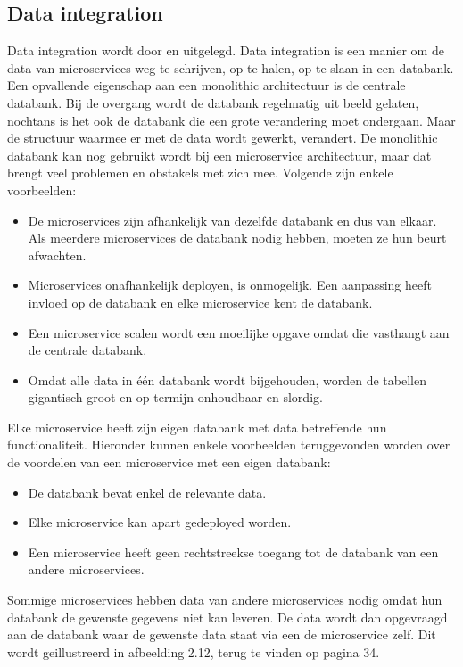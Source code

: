 \subsection{Data integration}
Data integration wordt door \textcite{Aradhye2018} en \textcite{Kumar2018} uitgelegd. Data integration is een manier om de data van microservices weg te schrijven, op te halen, op te slaan in een databank.
Een opvallende eigenschap aan een monolithic architectuur is de centrale databank. Bij de overgang wordt de databank regelmatig uit beeld gelaten, nochtans is het ook de databank die een grote verandering moet ondergaan. Maar de structuur waarmee er met de data wordt gewerkt, verandert. 
De monolithic databank kan nog gebruikt wordt bij een microservice architectuur, maar  dat brengt veel problemen en obstakels met zich mee. Volgende zijn enkele voorbeelden:
\begin{itemize}
	\item De microservices zijn afhankelijk van dezelfde databank en dus van elkaar. Als meerdere microservices de databank nodig hebben, moeten ze hun beurt afwachten.
	\item Microservices onafhankelijk deployen, is onmogelijk. Een aanpassing heeft invloed op de databank en elke microservice kent de databank. 
	\item Een microservice scalen wordt een moeilijke opgave omdat die vasthangt aan de centrale databank. 
	\item Omdat alle data in één databank wordt bijgehouden, worden de tabellen gigantisch groot en op termijn onhoudbaar en slordig. 
\end{itemize}

Elke microservice heeft zijn eigen databank met data betreffende hun functionaliteit. Hieronder kunnen enkele voorbeelden teruggevonden worden over de voordelen van een microservice met een eigen databank:
\begin{itemize}
	\item De databank bevat enkel de relevante data.
	\item Elke microservice kan apart gedeployed worden. 
	\item Een microservice heeft geen rechtstreekse toegang tot de databank van een andere microservices. 
\end{itemize}

Sommige microservices hebben data van andere microservices nodig omdat hun databank de gewenste gegevens niet kan leveren. De data wordt dan opgevraagd aan de databank waar de gewenste data staat via een de microservice zelf. Dit wordt geillustreerd in afbeelding 2.12, terug te vinden op pagina 34.

